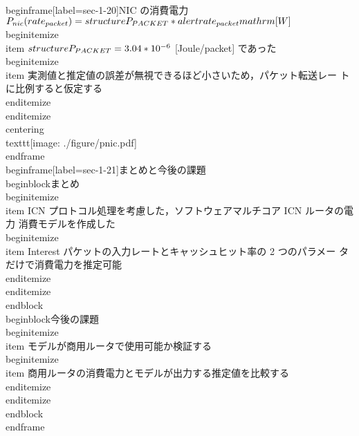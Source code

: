 {{{\\begin{frame}[label=sec-1-20]{NIC の消費電力}
$P_{nic}(rate_{packet}) = \\structure{P_{PACKET}} * \\alert{rate_{packet}} \\mathrm{[W]}$
\\begin{itemize}
\\item $\\structure{P_{PACKET}} = 3.04 * 10^{-6}$ [Joule/packet] であった
\\begin{itemize}
\\item 実測値と推定値の誤差が無視できるほど小さいため，パケット転送レー
トに比例すると仮定する
\\end{itemize}
\\end{itemize}
\\centering
\\texttt{[image: ./figure/pnic.pdf]}
\\end{frame}
\\begin{frame}[label=sec-1-21]{まとめと今後の課題}
\\begin{block}{まとめ}%
\\begin{itemize}
\\item ICN プロトコル処理を考慮した，ソフトウェアマルチコア ICN ルータの電力
消費モデルを作成した
\\begin{itemize}
\\item Interest パケットの入力レートとキャッシュヒット率の 2 つのパラメー
タだけで消費電力を推定可能
\\end{itemize}
\\end{itemize}
\\end{block}
\\begin{block}{今後の課題}%
\\begin{itemize}
\\item モデルが商用ルータで使用可能か検証する
\\begin{itemize}
\\item 商用ルータの消費電力とモデルが出力する推定値を比較する
\\end{itemize}
\\end{itemize}
\\end{block}
\\end{frame}

}}}
